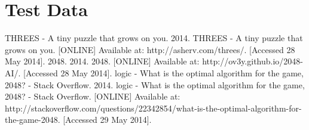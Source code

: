 \documentclass[a4paper,12pt,openany]{report}
\begin{document}

\section*{Test Data}


\begin{thebibliography}{20} 
	 THREES - A tiny puzzle that grows on you. 2014. THREES - A tiny puzzle that grows on you. [ONLINE] Available at: http://asherv.com/threes/. [Accessed 28 May 2014].
	 2048. 2014. 2048. [ONLINE] Available at: http://ov3y.github.io/2048-AI/. [Accessed 28 May 2014].
	 logic - What is the optimal algorithm for the game, 2048? - Stack Overflow. 2014. logic - What is the optimal algorithm for the game, 2048? - Stack Overflow. [ONLINE] Available at: http://stackoverflow.com/questions/22342854/what-is-the-optimal-algorithm-for-the-game-2048. [Accessed 29 May 2014].
\end{thebibliography} 
\end{document}
